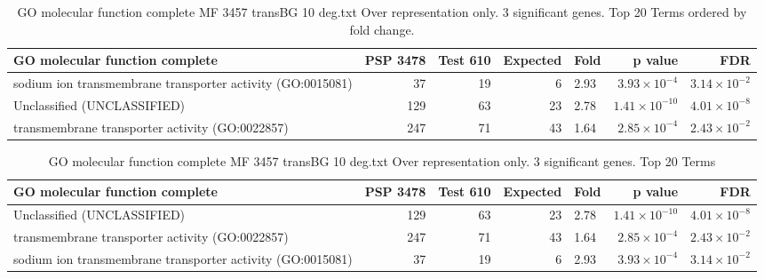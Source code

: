 

\begin{table}[ht]
\centering
\begin{adjustbox}{width=\textwidth}
\begin{tabular}{lrrrlrr}
  \hline
GO molecular function complete & PSP 3478 & Test 610 & Expected & Fold & p value & FDR \\ 
  \hline
sodium ion transmembrane transporter activity (GO:0015081) & 37 & 19 & 6 & 2.93 & $3.93 \times 10^{-4}$ & $3.14 \times 10^{-2}$ \\ 
  Unclassified (UNCLASSIFIED) & 129 & 63 & 23 & 2.78 & $1.41 \times 10^{-10}$ & $4.01 \times 10^{-8}$ \\ 
  transmembrane transporter activity (GO:0022857) & 247 & 71 & 43 & 1.64 & $2.85 \times 10^{-4}$ & $2.43 \times 10^{-2}$ \\ 
   \hline
\end{tabular}
\end{adjustbox}
\caption{GO molecular function complete MF 3457 transBG 10 deg.txt Over representation only. 3 significant genes. Top 20 Terms ordered by fold change. } 
\label{tab:GO molecular function complete MF 3457 transBG 10 deg.txt Over representation only. 3 significant genes. Top 20 Terms ordered by fold change. }
\end{table}



\begin{table}[ht]
\centering
\begin{adjustbox}{width=\textwidth}
\begin{tabular}{lrrrlrr}
  \hline
GO molecular function complete & PSP 3478 & Test 610 & Expected & Fold & p value & FDR \\ 
  \hline
Unclassified (UNCLASSIFIED) & 129 & 63 & 23 & 2.78 & $1.41 \times 10^{-10}$ & $4.01 \times 10^{-8}$ \\ 
  transmembrane transporter activity (GO:0022857) & 247 & 71 & 43 & 1.64 & $2.85 \times 10^{-4}$ & $2.43 \times 10^{-2}$ \\ 
  sodium ion transmembrane transporter activity (GO:0015081) & 37 & 19 & 6 & 2.93 & $3.93 \times 10^{-4}$ & $3.14 \times 10^{-2}$ \\ 
   \hline
\end{tabular}
\end{adjustbox}
\caption{GO molecular function complete MF 3457 transBG 10 deg.txt Over representation only. 3 significant genes. Top 20 Terms} 
\label{tab:GO molecular function complete MF 3457 transBG 10 deg.txt Over representation only. 3 significant genes. Top 20 Terms}
\end{table}

